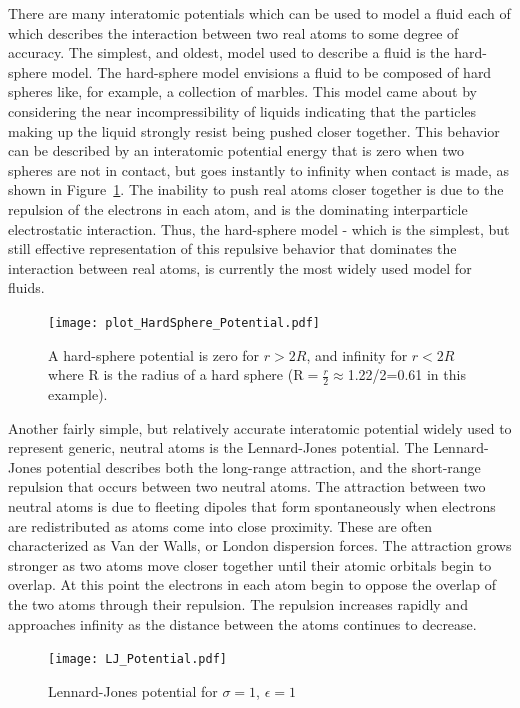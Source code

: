 \documentclass[double,12pt]{beavtex}
\begin{document}
There are many interatomic potentials which can be used to model a fluid 
each of which describes the interaction between two real atoms to some 
degree of accuracy. The simplest, and oldest, model used to describe a 
fluid is the hard-sphere model. The hard-sphere model envisions a fluid 
to be composed of hard spheres like, for example, a collection of marbles. 
This model came about by considering the near incompressibility of liquids 
indicating that the particles making up the liquid strongly resist being 
pushed closer together. This behavior can be described by an interatomic 
potential energy that is zero when two spheres are not in contact, but 
goes instantly to infinity when contact is made, as shown in 
Figure~\ref{fig:HardSphere_potential}. The inability to push 
real atoms closer together is due to the repulsion of the electrons in 
each atom, and is the dominating interparticle electrostatic interaction. 
Thus, the hard-sphere model - which is the simplest, but still effective 
representation of this repulsive behavior that dominates the interaction 
between real atoms, is currently the most widely used model for fluids.

\begin{figure}
    \centering
    \texttt{[image: plot\_HardSphere\_Potential.pdf]}
    \caption{A hard-sphere potential is zero for $r>2R$, and infinity 
    for $r<{2R}$ where R is the radius of a hard sphere 
    (R$=\frac{r}{2}\approx$1.22/2=0.61 in this example).}
    \label{fig:HardSphere_potential}
  \end{figure}

Another fairly simple, but relatively accurate interatomic potential widely 
used to represent generic, neutral atoms is the Lennard-Jones potential. 
The Lennard-Jones potential describes both the long-range attraction, 
and the short-range repulsion that occurs between two neutral atoms. 
The attraction between two neutral atoms is due to fleeting dipoles that 
form spontaneously when electrons are redistributed as atoms come into 
close proximity. These are often characterized as Van der Walls, or London 
dispersion forces. The attraction grows stronger as two atoms move closer 
together until their atomic orbitals begin to overlap. 
At this point the electrons in each atom begin to oppose the overlap of 
the two atoms through their repulsion. The repulsion increases rapidly and 
approaches infinity as the distance between the atoms continues to decrease.  
 
\begin{figure}
    \centering
    \texttt{[image: LJ\_Potential.pdf]}
    \caption{Lennard-Jones potential for $\sigma=1$, $\epsilon=1$}
    \label{fig:LJ_potential}
  \end{figure}
\end{document}
